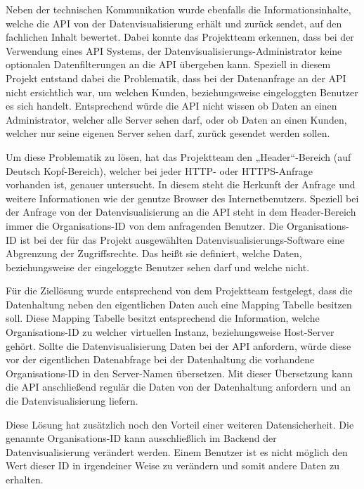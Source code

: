 Neben der technischen Kommunikation wurde ebenfalls die Informationsinhalte,
welche die \gls{API} von der Datenvisualisierung erhält und zurück sendet, auf
den fachlichen Inhalt bewertet. Dabei konnte das Projektteam erkennen, dass bei
der Verwendung eines \gls{API} Systems, der
Datenvisualisierungs\hyp{}Administrator keine optionalen Datenfilterungen an
die \gls{API} übergeben kann. Speziell in diesem Projekt entstand dabei die
Problematik, dass bei der Datenanfrage an der \gls{API} nicht ersichtlich war,
um welchen Kunden, beziehungsweise eingeloggten Benutzer es sich handelt.
Entsprechend würde die \gls{API} nicht wissen ob Daten an einen Administrator,
welcher alle Server sehen darf, oder ob Daten an einen Kunden, welcher nur
seine eigenen Server sehen darf, zurück gesendet werden sollen.

Um diese Problematik zu lösen, hat das Projektteam den „Header“\hyp{}Bereich
(auf Deutsch Kopf\hyp{}Bereich), welcher bei jeder \gls{HTTP}- oder
\gls{HTTPS}\hyp{}Anfrage vorhanden ist, genauer untersucht. In diesem steht die
Herkunft der Anfrage und weitere Informationen wie der genutze Browser des
Internetbenutzers. Speziell bei der Anfrage von der Datenvisualisierung an die
\gls{API} steht in dem Header\hyp{}Bereich immer die Organisations\hyp{}ID von
dem anfragenden Benutzer. Die Organisations\hyp{}ID ist bei der für das Projekt
ausgewählten Datenvisualisierungs\hyp{}Software eine Abgrenzung der
Zugriffsrechte. Das heißt sie definiert, welche Daten, beziehungsweise
 der eingeloggte Benutzer sehen darf und welche
nicht.

Für die Ziellösung wurde entsprechend von dem Projektteam festgelegt, dass die
Datenhaltung neben den eigentlichen Daten auch eine Mapping Tabelle besitzen
soll. Diese Mapping Tabelle besitzt entsprechend die Information, welche
Organisations\hyp{}ID zu welcher virtuellen Instanz, beziehungsweise
Host\hyp{}Server gehört. Sollte die Datenvisualisierung Daten bei der \gls{API}
anfordern, würde diese vor der eigentlichen Datenabfrage bei der Datenhaltung
die vorhandene Organisations\hyp{}ID in den Server\hyp{}Namen übersetzen. Mit
dieser Übersetzung kann die \gls{API} anschließend regulär die Daten von der
Datenhaltung anfordern und an die Datenvisualisierung liefern.

Diese Lösung hat zusätzlich noch den Vorteil einer weiteren Datensicherheit.
Die genannte Organisations\hyp{}ID kann ausschließlich im Backend der
Datenvisualisierung verändert werden. Einem Benutzer ist es nicht möglich den
Wert dieser ID in irgendeiner Weise zu verändern und somit andere Daten zu
erhalten.
\nl%

